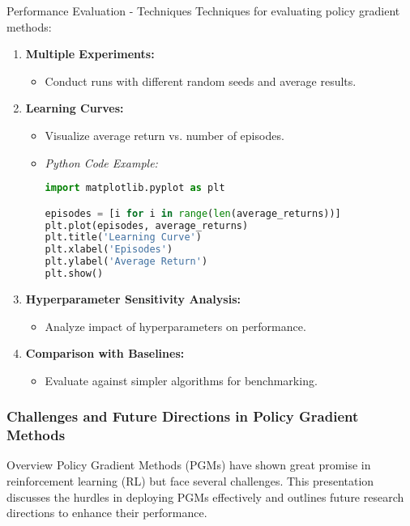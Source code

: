 \documentclass[aspectratio=169]{beamer}
\begin{document}
\begin{frame}[fragile]{Performance Evaluation - Techniques}
    Techniques for evaluating policy gradient methods:
    \begin{enumerate}
        \item \textbf{Multiple Experiments:}
        \begin{itemize}
            \item Conduct runs with different random seeds and average results.
        \end{itemize}

        \item \textbf{Learning Curves:}
        \begin{itemize}
            \item Visualize average return vs. number of episodes.
            \item \textit{Python Code Example:}
            \begin{lstlisting}[language=Python]
import matplotlib.pyplot as plt

episodes = [i for i in range(len(average_returns))]
plt.plot(episodes, average_returns)
plt.title('Learning Curve')
plt.xlabel('Episodes')
plt.ylabel('Average Return')
plt.show()
            \end{lstlisting}
        \end{itemize}

        \item \textbf{Hyperparameter Sensitivity Analysis:}
        \begin{itemize}
            \item Analyze impact of hyperparameters on performance.
        \end{itemize}

        \item \textbf{Comparison with Baselines:}
        \begin{itemize}
            \item Evaluate against simpler algorithms for benchmarking.
        \end{itemize}
    \end{enumerate}
\end{frame}

\begin{frame}[fragile]
    \frametitle{Challenges and Future Directions in Policy Gradient Methods}
    \begin{block}{Overview}
        Policy Gradient Methods (PGMs) have shown great promise in reinforcement learning (RL) but face several challenges. This presentation discusses the hurdles in deploying PGMs effectively and outlines future research directions to enhance their performance.
    \end{block}
\end{frame}
\end{document}
